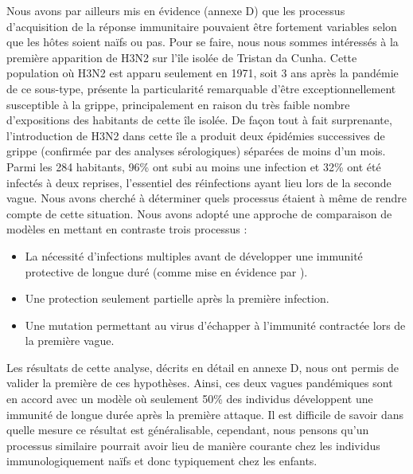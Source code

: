 Nous avons par ailleurs mis en évidence (annexe D) que les processus
d'acquisition de la réponse immunitaire pouvaient être fortement
variables selon que les hôtes soient naïfs ou pas. Pour se faire, nous
nous sommes intéressés à la première apparition de H3N2 sur l'île
isolée de Tristan da Cunha. Cette population où H3N2 est apparu
seulement en 1971, soit 3 ans après la pandémie de ce sous-type,
présente la particularité remarquable d'être exceptionnellement
susceptible à la grippe, principalement en raison du très faible
nombre d'expositions des habitants de cette île isolée. De façon tout
à fait surprenante, l'introduction de H3N2 dans cette île a produit
deux épidémies successives de grippe (confirmée par des analyses
sérologiques) séparées de moins d'un mois. Parmi les 284 habitants,
96\% ont subi au moins une infection et 32\% ont été infectés à deux
reprises, l'essentiel des réinfections ayant lieu lors de la seconde
vague. Nous avons cherché à déterminer quels processus étaient à même
de rendre compte de cette situation. Nous avons adopté une approche de
comparaison de modèles en mettant en contraste trois processus :
\begin{itemize}
\item La nécessité d'infections multiples avant de développer une
  immunité protective de longue duré (comme mise en évidence par
  \citet{Mathews2007}).
\item Une protection seulement partielle après la première infection.
\item Une mutation permettant au virus d'échapper à l'immunité
  contractée lors de la première vague.
\end{itemize}

Les résultats de cette analyse, décrits en détail en annexe D, nous
ont permis de valider la première de ces hypothèses. Ainsi, ces deux
vagues pandémiques sont en accord avec un modèle où seulement 50\% des
individus développent une immunité de longue durée après la première
attaque.  Il est difficile de savoir dans quelle mesure ce résultat
est généralisable, cependant, nous pensons qu'un processus similaire
pourrait avoir lieu de manière courante chez les individus
immunologiquement naïfs et donc typiquement chez les enfants.

